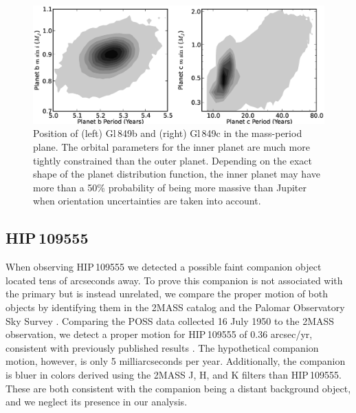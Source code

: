 \begin{figure}[htbp]
\centerline{\includegraphics[width=1.0\textwidth]{chapter3/f16.eps}}
\caption[Posterior distributions of allowed masses and periods of 
Gl\,849\,b and Gl\,849\,c]{Position of (left) Gl\,849b and (right) Gl\,849c in the mass-period plane. The orbital parameters for the inner planet are much more tightly constrained than the outer planet. Depending on the exact shape of the planet distribution function, the inner planet may have more than a 50\% probability of being more massive than Jupiter when orientation uncertainties are taken into account.
  }
\label{849}
\end{figure}



\subsection{HIP\,109555}
When observing HIP\,109555 we detected a possible faint companion object located tens of arcseconds away. To prove this companion is not associated with the primary but is instead unrelated, we compare the proper motion of both objects by identifying them in the 2MASS catalog \citep{Skrutskie06} and the Palomar Observatory Sky Survey \citep{Abell59}. Comparing the POSS data collected 16 July 1950 to the 2MASS observation, we detect a proper motion for HIP\,109555 of 0.36 arcsec/yr, consistent with previously published results \citep{vanLeeuwen07}. The hypothetical companion motion, however, is only 5 milliarcseconds per year. Additionally, the companion is bluer in colors derived using the 2MASS J, H, and K filters than HIP\,109555. These are both consistent with the companion being a distant background object, and we neglect its presence in our analysis.

